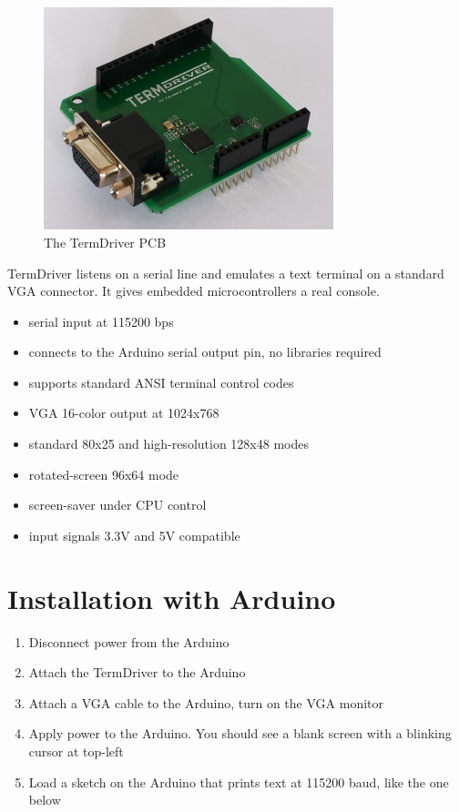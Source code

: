 \documentclass{article}
\begin{document}
\begin{figure}[H]
  \centering
  \includegraphics[width=0.75\textwidth]{img/img1}
  \caption{The TermDriver PCB}
\end{figure}

TermDriver listens on a serial line and emulates a text terminal on a
standard VGA connector. It gives embedded microcontrollers a real console.

\begin{itemize}
\item serial input at 115200 bps
\item connects to the Arduino serial output pin, no libraries required
\item supports standard ANSI terminal control codes
\item VGA 16-color output at 1024x768 
\item standard 80x25 and high-resolution 128x48 modes
\item rotated-screen 96x64 mode
\item screen-saver under CPU control
\item input signals 3.3V and 5V compatible
\end{itemize}

\newpage
\tableofcontents
\listoffigures

\newpage
\section{Installation with Arduino}

\begin{enumerate}
\item Disconnect power from the Arduino
\item Attach the TermDriver to the Arduino
\item Attach a VGA cable to the Arduino, turn on the VGA monitor
\item Apply power to the Arduino. You should see a blank screen with a blinking cursor at top-left
\item Load a sketch on the Arduino that prints text at 115200 baud, like the one below
\end{enumerate}
\end{document}
